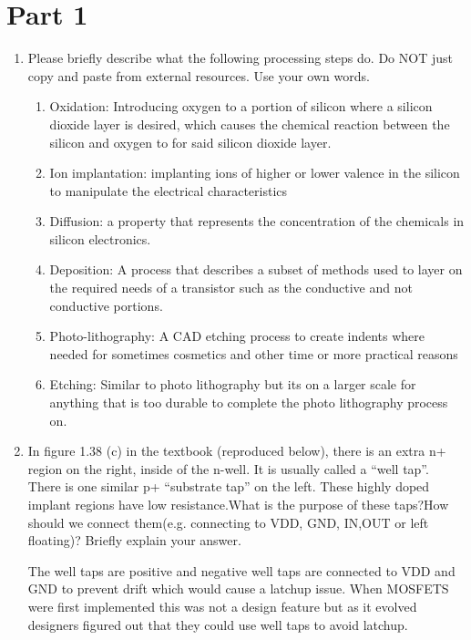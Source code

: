 \documentclass{article}
\begin{document}
\section*{Part 1}
\begin{enumerate}
    \item Please briefly describe what the following processing steps do. Do NOT just copy and paste from external resources. Use your own words.
    \begin{enumerate}
        \item Oxidation: Introducing oxygen to a portion of silicon where a silicon dioxide layer is desired, which causes the chemical reaction between the silicon and oxygen to for said silicon dioxide layer.
        \item Ion implantation: implanting ions of higher or lower valence in the silicon to manipulate the electrical characteristics 
        \item Diffusion: a property that represents the concentration of the chemicals in silicon electronics.
        \item Deposition: A process that describes a subset of methods used to layer on the required needs of a transistor such as the conductive and not conductive portions.
        \item Photo-lithography: A CAD etching process to create indents where needed for sometimes cosmetics and other time or more practical reasons
        \item Etching: Similar to photo lithography but its on a larger scale for anything that is too durable to complete the photo lithography process on.
    \end{enumerate}
    \item In figure 1.38 (c) in the textbook (reproduced below), there is an extra n+ region on the right, inside of the n-well. It is usually called a “well tap”. There is one similar p+ “substrate tap” on the left. These highly doped implant regions have low resistance.What is the purpose of these taps?How should we connect them(e.g. connecting to VDD, GND, IN,OUT or left floating)? Briefly explain your answer.
    \begin{center}
    \end{center}
    \begin{center}
        The well taps are positive and negative well taps are connected to VDD and GND to prevent drift which would cause a latchup issue. When MOSFETS were first implemented this was not a design feature but as it evolved designers figured out that they could use well taps to avoid latchup.
    \end{center}
\end{enumerate}
\newpage
\end{document}
